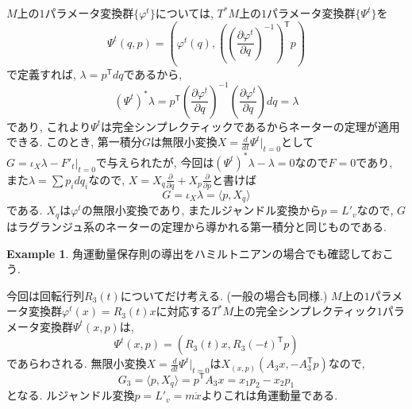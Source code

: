 \documentclass[a4paper]{ujarticle}
\numberwithin{equation}{section}
\theoremstyle{definition}
\newtheorem{example}{Example}
\begin{document}
        $M$上の$1$パラメータ変換群$\{\varphi^{t}\}$については, $T^{*}M$上の$1$パラメータ変換群$\{\Psi^{t}\}$を
        \[
            \Psi^{t}(q, p) = (\varphi^{t}(q), \left(\left(\frac{\partial \varphi^{t}}{\partial q}\right)^{-1}\right)^{\mathsf{T}} p )
        \]  
        で定義すれば, $\lambda = p^{\mathsf{T}} d q$であるから,
        \[
            (\Psi^{t})^{*}\lambda =  p^{\mathsf{T}} \left(\frac{\partial \varphi^{t}}{\partial q}\right)^{-1} \left(\frac{\partial \varphi^{t}}{\partial q}\right) d q = \lambda
        \]
        であり, これより$\Psi^{t}$は完全シンプレクティックであるからネーターの定理が適用できる.
        このとき, 第一積分$G$は無限小変換$X = \frac{d}{dt} \Psi^{t}|_{t = 0}$として
        $G = \iota_{X} \lambda - F'_{t}|_{t = 0}$で与えられたが, 
        今回は$(\Psi^{t})^{*}\lambda - \lambda = 0$なので$F = 0$であり,
        また$\lambda = \sum p_i dq_i$なので, $X = X_q \frac{\partial}{\partial q} + X_p \frac{\partial}{\partial p}$と書けば
        \[
            G = \iota_{X} \lambda = \langle p, X_q\rangle
        \]
        である. $X_q$は$\varphi^{t}$の無限小変換であり, またルジャンドル変換から$p = L'_{v}$なので, $G$はラグランジュ系のネーターの定理から導かれる第一積分と同じものである.

        \begin{example}
            角運動量保存則の導出をハミルトニアンの場合でも確認しておこう.

            今回は回転行列$R_3(t)$についてだけ考える. (一般の場合も同様.)
            $M$上の$1$パラメータ変換群$\varphi^{t}(x) = R_3(t) x$に対応する$T^{*}M$上の完全シンプレクティック$1$パラメータ変換群$\Psi^{t}(x, p)$は,
            \[
                \Psi^{t}(x, p) = (R_3(t) x, R_3(-t)^{\mathsf{T}} p)
            \]
            であらわされる.
            無限小変換$X = \frac{d}{dt} \Psi^{t}|_{t = 0}$は$X_{(x, p)}(A_3 x, - A_3^{\mathsf{T}} p)$なので, 
            \[
                    G_3 = \langle p, X_q \rangle = p^{\mathsf{T}} A_3 x = x_1 p_2 - x_2 p_1
            \]
            となる. ルジャンドル変換$p = L'_v = m \dot{x}$よりこれは角運動量である.
        \end{example}
\end{document}
